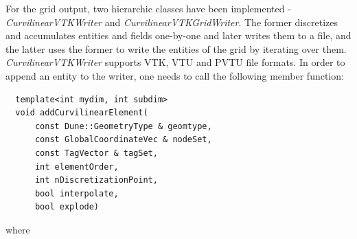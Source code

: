 
For the grid output, two hierarchic classes have been implemented - \textit{CurvilinearVTKWriter} and \textit{CurvilinearVTKGridWriter}. The former discretizes and accumulates entities and fields one-by-one and later writes them to a file, and the latter uses the former to write the entities of the grid by iterating over them. \textit{CurvilinearVTKWriter} supports VTK, VTU and PVTU file formats.  
In order to append an entity to the writer, one needs to call the following member function:

\begin{mybox}
\begin{lstlisting}
  template<int mydim, int subdim>
  void addCurvilinearElement(
	  const Dune::GeometryType & geomtype,
	  const GlobalCoordinateVec & nodeSet,
	  const TagVector & tagSet,
	  int elementOrder,
	  int nDiscretizationPoint,
	  bool interpolate,
	  bool explode)
\end{lstlisting}
\end{mybox}
\noindent
where


